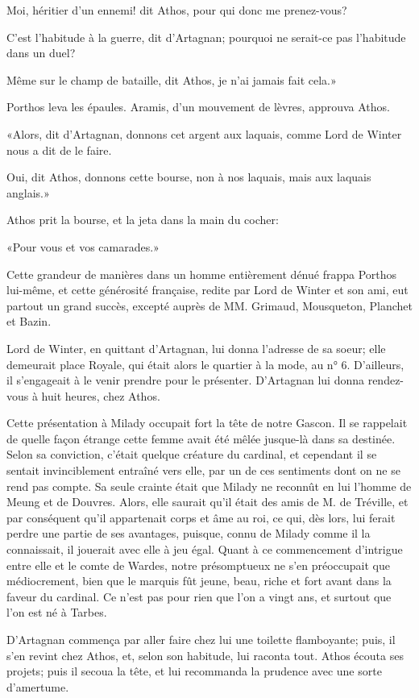\speak  Moi, héritier d'un ennemi! dit Athos, pour qui donc me prenez-vous? 

\speak  C'est l'habitude à la guerre, dit d'Artagnan; pourquoi ne serait-ce pas l'habitude dans un duel? 

\speak  Même sur le champ de bataille, dit Athos, je n'ai jamais fait cela.» 

Porthos leva les épaules. Aramis, d'un mouvement de lèvres, approuva Athos. 

«Alors, dit d'Artagnan, donnons cet argent aux laquais, comme Lord de Winter nous a dit de le faire. 

\speak  Oui, dit Athos, donnons cette bourse, non à nos laquais, mais aux laquais anglais.» 

Athos prit la bourse, et la jeta dans la main du cocher: 

«Pour vous et vos camarades.» 

Cette grandeur de manières dans un homme entièrement dénué frappa Porthos lui-même, et cette générosité française, redite par Lord de Winter et son ami, eut partout un grand succès, excepté auprès de MM. Grimaud, Mousqueton, Planchet et Bazin. 

Lord de Winter, en quittant d'Artagnan, lui donna l'adresse de sa soeur; elle demeurait place Royale, qui était alors le quartier à la mode, au n° 6. D'ailleurs, il s'engageait à le venir prendre pour le présenter. D'Artagnan lui donna rendez-vous à huit heures, chez Athos. 

Cette présentation à Milady occupait fort la tête de notre Gascon. Il se rappelait de quelle façon étrange cette femme avait été mêlée jusque-là dans sa destinée. Selon sa conviction, c'était quelque créature du cardinal, et cependant il se sentait invinciblement entraîné vers elle, par un de ces sentiments dont on ne se rend pas compte. Sa seule crainte était que Milady ne reconnût en lui l'homme de Meung et de Douvres. Alors, elle saurait qu'il était des amis de M. de Tréville, et par conséquent qu'il appartenait corps et âme au roi, ce qui, dès lors, lui ferait perdre une partie de ses avantages, puisque, connu de Milady comme il la connaissait, il jouerait avec elle à jeu égal. Quant à ce commencement d'intrigue entre elle et le comte de Wardes, notre présomptueux ne s'en préoccupait que médiocrement, bien que le marquis fût jeune, beau, riche et fort avant dans la faveur du cardinal. Ce n'est pas pour rien que l'on a vingt ans, et surtout que l'on est né à Tarbes. 

D'Artagnan commença par aller faire chez lui une toilette flamboyante; puis, il s'en revint chez Athos, et, selon son habitude, lui raconta tout. Athos écouta ses projets; puis il secoua la tête, et lui recommanda la prudence avec une sorte d'amertume. 

